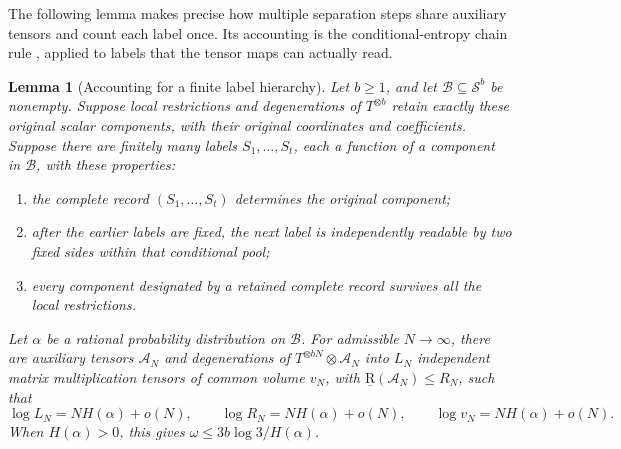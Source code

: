 \documentclass[11pt]{article}
\numberwithin{equation}{section}
\newtheorem{lemma}[theorem]{Lemma}
\theoremstyle{definition}
\theoremstyle{remark}
\begin{document}
The following lemma makes precise how multiple separation steps share
auxiliary tensors and count each label once.  Its accounting is the
conditional-entropy chain rule \citep{shannon1948}, applied to labels
that the tensor maps can actually read.

\begin{lemma}[Accounting for a finite label hierarchy]
\label{lem:hierarchy}
Let \(b\geq1\), and let \(\mathcal B\subseteq\mathcal S^b\) be
nonempty.  Suppose local restrictions and degenerations of
\(T^{\otimes b}\) retain exactly these original scalar components, with
their original coordinates and coefficients.  Suppose there are finitely many
labels \(S_1,\ldots,S_t\), each a function of a component in
\(\mathcal B\), with these properties:
\begin{enumerate}[label=\textup{(\roman*)}]
 \item the complete record \((S_1,\ldots,S_t)\) determines the original
       component;
 \item after the earlier labels are fixed, the next label is independently
       readable by two fixed sides within that conditional pool;
 \item every component designated by a retained complete record survives
       all the local restrictions.
\end{enumerate}
Let \(\alpha\) be a rational probability distribution on \(\mathcal B\).
For admissible \(N\to\infty\), there are auxiliary tensors
\(\mathcal A_N\) and degenerations of
\(T^{\otimes bN}\otimes\mathcal A_N\) into \(L_N\) independent matrix
multiplication tensors of common volume \(v_N\), with
\(\operatorname{\underline R}(\mathcal A_N)\leq R_N\), such that
\begin{equation}
 \log L_N=NH(\alpha)+o(N),\qquad
 \log R_N=NH(\alpha)+o(N),\qquad
 \log v_N=NH(\alpha)+o(N).
 \label{alg:hierarchy-rates}
\end{equation}
When \(H(\alpha)>0\), this gives
\(\omega\leq3b\log3/H(\alpha)\).
\end{lemma}
\end{document}
